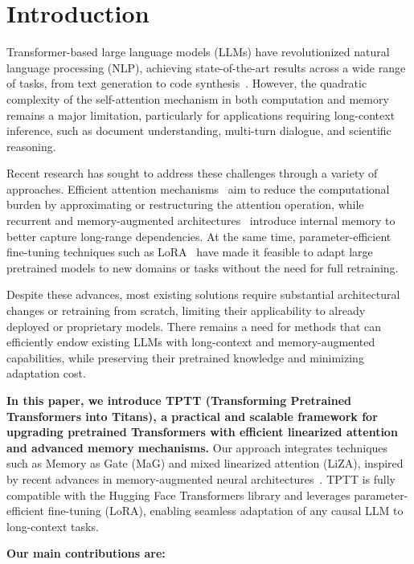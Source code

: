 \documentclass[10pt,a4paper]{article}
\begin{document}
\section{Introduction}

Transformer-based large language models (LLMs) have revolutionized natural language processing (NLP), achieving state-of-the-art results across a wide range of tasks, from text generation to code synthesis~\cite{vaswani2017attention, mann2020language}. However, the quadratic complexity of the self-attention mechanism in both computation and memory remains a major limitation, particularly for applications requiring long-context inference, such as document understanding, multi-turn dialogue, and scientific reasoning.

Recent research has sought to address these challenges through a variety of approaches. Efficient attention mechanisms~\cite{katharopoulos2020transformers, yang2024parallelizing} aim to reduce the computational burden by approximating or restructuring the attention operation, while recurrent and memory-augmented architectures~\cite{mercat2024linearizing, behrouz2024titans} introduce internal memory to better capture long-range dependencies. At the same time, parameter-efficient fine-tuning techniques such as LoRA~\cite{hu2022lora} have made it feasible to adapt large pretrained models to new domains or tasks without the need for full retraining.

Despite these advances, most existing solutions require substantial architectural changes or retraining from scratch, limiting their applicability to already deployed or proprietary models. There remains a need for methods that can efficiently endow existing LLMs with long-context and memory-augmented capabilities, while preserving their pretrained knowledge and minimizing adaptation cost.

\textbf{In this paper, we introduce TPTT (Transforming Pretrained Transformers into Titans), a practical and scalable framework for upgrading pretrained Transformers with efficient linearized attention and advanced memory mechanisms.} Our approach integrates techniques such as Memory as Gate (MaG) and mixed linearized attention (LiZA), inspired by recent advances in memory-augmented neural architectures~\cite{behrouz2024titans}. TPTT is fully compatible with the Hugging Face Transformers library and leverages parameter-efficient fine-tuning (LoRA), enabling seamless adaptation of any causal LLM to long-context tasks.


\textbf{Our main contributions are:}
\end{document}
